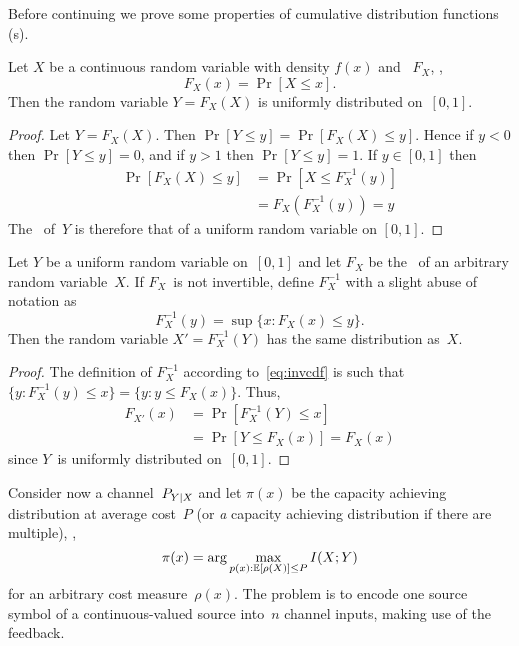 Before continuing we prove some properties of cumulative distribution functions
(\cdf s).

\begin{lemma}
  \label{lem:cdfunif}
  Let $X$ be a continuous random variable with density $f(x)$ and \cdf\ $F_X$,
  \ie,
  \begin{equation*}
    F_X(x) = \Pr[X \le x].
  \end{equation*}
  Then the random variable $Y = F_X(X)$ is uniformly distributed on~$[0,1]$.
\end{lemma}

\begin{proof}
  Let $Y = F_X(X)$. Then $\Pr[Y \le y] = \Pr[F_X(X) \le y]$.
  Hence if $y < 0$ then $\Pr[Y \le y] = 0$, and if $y > 1$ then $\Pr[Y \le y] =
  1$.  If $y \in [0,1]$ then
  \begin{align*}
    \Pr[F_X(X) \le y] &= \Pr[X \le F_X^{-1}(y)] \\
    &= F_X(F_X^{-1}(y)) = y
  \end{align*}
  The \cdf\ of~$Y$ is therefore that of a uniform random variable on $[0,1]$.
\end{proof}


\begin{lemma}
  \label{lem:invcdf}
  Let $Y$ be a uniform random variable on~$[0,1]$ and let $F_X$ be the \cdf\ of
  an arbitrary random variable~$X$. If $F_X$~is not invertible, define
  $F_X^{-1}$ with a slight abuse of notation as
  \begin{equation}
    \label{eq:invcdf}
    F_X^{-1}(y) = \sup \{x : F_X(x) \le y\}.
  \end{equation}
  Then the random variable $X' = F_X^{-1}(Y)$ has the same distribution as~$X$.
\end{lemma}

\begin{proof}
  The definition of $F_X^{-1}$ according to~\eqref{eq:invcdf} is such
  that $\{y: F_X^{-1}(y) \le x\} = \{y: y \le F_X(x)\}$. Thus,
  \begin{align*}
    F_{X'}(x) &= \Pr[F_X^{-1}(Y) \le x] \\
    &= \Pr[Y \le F_X(x)]  = F_X(x)
  \end{align*}
  since $Y$~is uniformly distributed on~$[0,1]$.
\end{proof}

Consider now a channel~$P_{Y|X}$ and let $\pi(x)$ be the capacity achieving
distribution at average cost~$P$ (or \emph{a} capacity achieving distribution if
there are multiple), \ie, 
\begin{equation*}
  \pi(x) = \arg\max_{p(x): \mathbb{E}[\rho(X)] \le P} I(X;Y)
\end{equation*}
for an arbitrary cost measure~$\rho(x)$.  The problem is to encode one source
symbol of a continuous-valued source into~$n$ channel inputs, making use of the
feedback.

